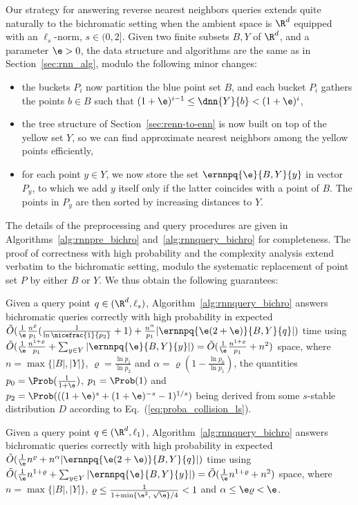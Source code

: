 Our strategy for answering reverse nearest neighbors queries extends
quite naturally to the bichromatic setting when the ambient space is
$\R^d$ equipped with an $\ell_s$-norm, $s\in (0,2]$. Given two finite
  subsets $B,Y$ of $\R^d$, and a parameter $\e> 0$, the data
  structure and algorithms are the same as in
  Section~\ref{sec:rnn_alg}, modulo the following minor changes:
\begin{itemize}
\item the buckets $P_i$ now partition the blue point
  set $B$, and each bucket $P_i$ gathers the points $b\in B$ such that
  $(1+\e)^{i-1}\leq \dnn{Y}{b} < (1+\e)^i$,
\item the tree structure of Section~\ref{sec:renn-to-enn} is now built
  on top of the yellow set $Y$, so we can find approximate nearest
  neighbors among the yellow points efficiently,
\item for each point $y\in Y$, we now store the set
  $\ernnpq{\e}{B,Y}{y}$ in vector $P_y$, to which we add $y$ itself
  only if the latter coincides with a point of $B$. The points in
  $P_y$ are then sorted by increasing distances to $Y$.
\end{itemize}
The details of the preprocessing and query procedures are given in
Algorithms~\ref{alg:rnnpre_bichro} and~\ref{alg:rnnquery_bichro} for
completeness. The proof of correctness with high probability and the
complexity analysis extend verbatim to the bichromatic setting, modulo
the systematic replacement of point set $P$ by either $B$ or $Y$. We
thus obtain the following guarantees:
\begin{thm}\label{thm:rnnquery_bichro}
Given a query point $q\in (\R^d, \ell_s)$,
Algorithm~\ref{alg:rnnquery_bichro} answers bichromatic \rnn
queries correctly with high probability in expected $\tilde O
(\frac{1}{\e}\frac{n^{\varrho}}{p_1}(\frac{1}{\ln
  \nicefrac{1}{p_2}}+1) + \frac{n^\alpha}{p_1}
|\ernnpq{\e(2+\e)}{B,Y}{q}|)$ time using $\tilde O(\frac{1}{\e}
\frac{n^{1+\varrho}}{p_1} + \sum_{y\in Y} |\ernnpq{\e}{B,Y}{y}|) = \tilde
O(\frac{1}{\e} \frac{n^{1+\varrho}}{p_1} + n^2)$ space, where
$n=\max\{|B|, |Y|\}$, $\varrho=\frac{\ln p_1}{\ln p_2}$ and
$\alpha=\varrho(1-\frac{\ln p_0}{\ln p_1})$, the quantities
$p_0=\Prob(\frac{1}{1+\e})$, $p_1=\Prob(1)$ and
$p_2=\Prob(((1+\e)^s+(1+\e)^{-s}-1)^{1/s})$ being derived from some
$s$-stable distribution $D$ according to
Eq.~(\ref{eq:proba_collision_ls}).
\end{thm}
\addtocounter{thm}{-1}
\begin{thm}[case $s=1$]\label{thm:rnnquery_bichro_l1}
Given a query point $q\in (\R^d, \ell_1)$,
Algorithm~\ref{alg:rnnquery_bichro} answers bichromatic \rnn queries
correctly with high probability in expected $\tilde O
(\frac{1}{\e}n^{\varrho} + n^\alpha |\ernnpq{\e(2+\e)}{B,Y}{q}|)$ time
using $\tilde O(\frac{1}{\e} n^{1+\varrho} + \sum_{y\in Y}
|\ernnpq{\e}{B,Y}{y}|) = \tilde O(\frac{1}{\e} n^{1+\varrho} + n^2)$
space, where $n=\max\{|B|, |Y|\}$, $\varrho\leq
\frac{1}{1+\min\{\e^2,\; \sqrt{\e}\}/4}<1$ and
$\alpha\leq\e\varrho<\e$.
\end{thm}
